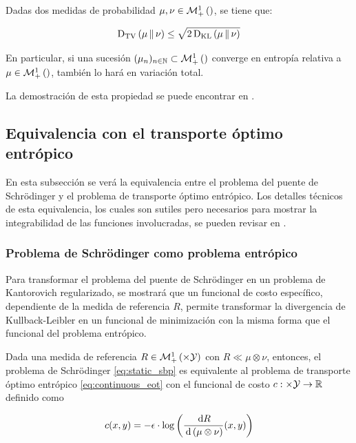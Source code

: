 \begin{teo}
	Dadas dos medidas de probabilidad $\mu,\nu\in\mathcal{M}_+^1\left(\right)$, se tiene que:

	\begin{equation*}
		\operatorname{D_{TV}}\left(\mu\,\|\,\nu\right) \leq \sqrt{2\operatorname{D_{KL}}\left(\mu\,\|\,\nu\right)}
	\end{equation*}

	En particular, si una sucesión $(\mu_n)_{n\in\mathbb{N}}\subset \mathcal{M}_+^1\left(\right)$ converge en entropía relativa a $\mu\in\mathcal{M}_+^1\left(\right)$, también lo hará en variación total.
\end{teo}

La demostración de esta propiedad se puede encontrar en \cite{nutz2022introduction}. 










\subsection{Equivalencia con el transporte óptimo entrópico}

En esta subsección se verá la equivalencia entre el problema del puente de Schrödinger y el problema de transporte óptimo entrópico. Los detalles técnicos de esta equivalencia, los cuales son sutiles pero necesarios para mostrar la integrabilidad de las funciones involucradas, se pueden revisar en \cite{nutz2022introduction}.

\subsubsection{Problema de Schrödinger como problema entrópico}

Para transformar el problema del puente de Schrödinger en un problema de Kantorovich regularizado, se mostrará que un funcional de costo específico, dependiente de la medida de referencia $R$, permite transformar la divergencia de Kullback-Leibler en un funcional de minimización con la misma forma que el funcional del problema entrópico.

\begin{prop}
	Dada una medida de referencia $R\in\probmeasure{\xspace\times\yspace}$ con $R\ll\mu\otimes\nu$, entonces, el problema de Schrödinger \eqref{eq:static_sbp} es equivalente al problema de transporte óptimo entrópico \eqref{eq:continuous_eot} con el funcional de costo $c:\times\mathcal{Y}\to\mathbb{R}$ definido como

	\begin{equation*}
		c(x,y)=-\epsilon\cdot\log\left(\frac{\,\operatorname{d}\! R}{\,\operatorname{d}\!\,\left(\mu\otimes\nu\right)}(x,y)\right)
	\end{equation*}
\end{prop}

